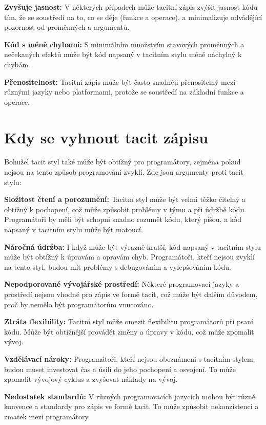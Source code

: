 \documentclass[male,czech]{kithesis}
\begin{document}
\textbf{Zvyšuje jasnost:}
V některých případech může tacitní zápis zvýšit jasnost kódu tím, 
že se soustředí na to, co se děje (funkce a operace), 
a minimalizuje odvádějící pozornost od proměnných a argumentů.

\textbf{Kód s méně chybami:}
S minimálním množstvím stavových proměnných a 
nečekaných efektů může být kód napsaný v tacitním stylu méně náchylný k chybám.

\textbf{Přenositelnost:}
Tacitní zápis může být často snadněji přenositelný mezi různými jazyky nebo platformami, 
protože se soustředí na základní funkce a operace.


\section{Kdy se vyhnout tacit zápisu}

Bohužel tacit styl také může být obtížný pro programátory, 
zejména pokud nejsou na tento způsob programování zvyklí. 
Zde jsou argumenty proti tacit stylu:

\textbf{Složitost čtení a porozumění:} 
Tacitní styl může být velmi těžko čitelný a obtížný k pochopení, 
což může způsobit problémy v týmu a při údržbě kódu. 
Programátoři by měli být schopni snadno rozumět kódu,
který píšou, a kód napsaný v tacitním stylu může být matoucí.

\textbf{Náročná údržba:}
I když může být výrazně kratší, 
kód napsaný v tacitním stylu může být obtížný k úpravám a opravám chyb. 
Programátoři, kteří nejsou zvyklí na tento styl, 
budou mít problémy s debugováním a vylepšováním kódu.

\textbf{Nepodporované vývojářské prostředí:}
Některé programovací jazyky a prostředí nejsou vhodné pro zápis ve formě tacit, 
což může být dalším důvodem, proč by nemělo být programátorům vnucováno.

\textbf{Ztráta flexibility:}
Tacitní styl může omezit flexibilitu programátorů při psaní kódu.
Může být obtížnější provádět změny a úpravy v kódu, což může zpomalit vývoj.

\textbf{Vzdělávací nároky:}
Programátoři, kteří nejsou obeznámeni s tacitním stylem, 
budou muset investovat čas a úsilí do jeho pochopení a osvojení. 
To může zpomalit vývojový cyklus a zvyšovat náklady na vývoj.

\textbf{Nedostatek standardů:}
V různých programovacích jazycích mohou být různé konvence a 
standardy pro zápis ve formě tacit. To může způsobit nekonzistenci a zmatek mezi programátory.
\end{document}
